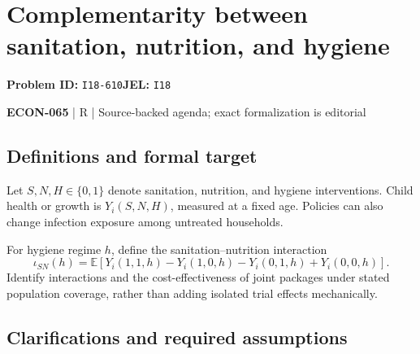 \documentclass[11pt,a4paper]{article}
\begin{document}
\section*{Complementarity between sanitation, nutrition, and hygiene}
\textbf{Problem ID:} \texttt{I18-610}\quad \textbf{JEL:} \texttt{I18}\par
\label{problem:OP-0634}


\label{audited:ECON-065}

{\sffamily\small\color{muted}\textbf{ECON-065} | R | Source-backed agenda; exact formalization is editorial\par}

\subsection*{Definitions and formal target}

Let $S,N,H\in\{0,1\}$ denote sanitation, nutrition, and hygiene interventions. Child health or growth is $Y_i(S,N,H)$, measured at a fixed age. Policies can also change infection exposure among untreated households.

For hygiene regime $h$, define the sanitation–nutrition interaction
\[
 \iota_{SN}(h)=\mathbb E[Y_i(1,1,h)-Y_i(1,0,h)-Y_i(0,1,h)+Y_i(0,0,h)].
\]
Identify interactions and the cost-effectiveness of joint packages under stated population coverage, rather than adding isolated trial effects mechanically.

\subsection*{Clarifications and required assumptions}
\end{document}
